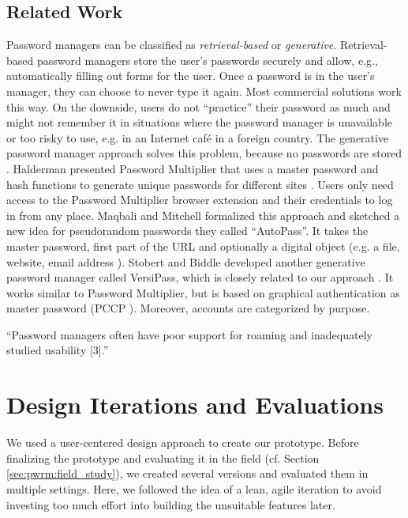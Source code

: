 \subsection{Related Work}
Password managers can be classified as \textit{retrieval-based} or \textit{generative}. Retrieval-based password managers store the user's passwords securely and allow, e.g., automatically filling out forms for the user. Once a password is in the user's manager, they can choose to never type it again. Most commercial solutions work this way. On the downside, users do not ``practice'' their password as much and might not remember it in situations where the password manager is unavailable or too risky to use, e.g. in an Internet café in a foreign country. The generative password manager approach solves this problem, because no passwords are stored \cite{McCarney2012Tapas}. Halderman \etal presented Password Multiplier that uses a master password and hash functions to generate unique passwords for different sites \cite{Halderman2005ConvenientPWM}. Users only need access to the Password Multiplier browser extension and their credentials to log in from any place. Maqbali and Mitchell formalized this approach and sketched a new idea for pseudorandom passwords they called ``AutoPass''\cite{Maqbali2016PasswordGenerators}. It takes the master password, first part of the URL and optionally a digital object (e.g. a file, website, email address \cite{Biddle2011DigitalObjectsPWs}).
Stobert and Biddle developed another generative password manager called VersiPass, which is closely related to our approach \cite{Stobert2014PWMThatDoesntRemember}. It works similar to Password Multiplier, but is based on graphical authentication as master password (PCCP \cite{Chiasson2008PCCP}). Moreover, accounts are categorized by purpose. 

``Password managers often have poor support for roaming and inadequately studied usability [3].'' \cite{Herley2012PersistenceOfPasswords}

\section{Design Iterations and Evaluations}
We used a user-centered design approach to create our prototype. Before finalizing the prototype and evaluating it in the field (cf. Section \ref{sec:pwrm:field_study}), we created several versions and evaluated them in multiple settings. Here, we followed the idea of a lean, agile iteration to avoid investing too much effort into building the unsuitable features later. 

